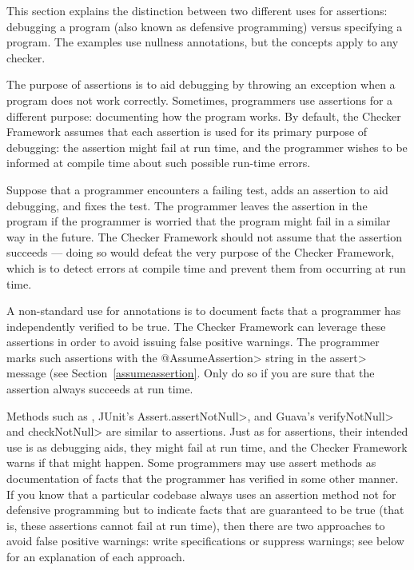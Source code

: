 


This section explains the distinction between two different uses for
assertions:  debugging a program (also known as defensive programming)
versus specifying a program.  The examples use nullness annotations, but
the concepts apply to any checker.

The purpose of assertions is to aid debugging by throwing an exception
when a program does not work correctly.  Sometimes, programmers use assertions for a
different  purpose:  documenting how
the program works.  By default, the Checker Framework assumes that each assertion
is used for its primary purpose of debugging:  the assertion might fail at run time, and the programmer
wishes to be informed at compile time about such possible run-time errors.

Suppose that a
programmer encounters a failing test, adds an assertion to aid debugging, and fixes the
test.  The programmer leaves the assertion in the program if the programmer
is worried that the program might fail in a similar way in the future.
The Checker Framework should not assume that the assertion succeeds ---
doing so would defeat the very purpose of the Checker Framework, which is
to detect errors at compile time and prevent them from occurring at run
time.

A non-standard use for annotations is to document facts that a programmer
has independently verified to be true.  The Checker Framework can
leverage these assertions in order to avoid issuing false positive
warnings.  The programmer marks such assertions with the \<@AssumeAssertion>
string in the \<assert> message (see Section~\ref{assumeassertion}.  Only
do so if you are sure that the assertion always succeeds at run time.

\label{assertion-methods}
Methods such as
,
JUnit's \<Assert.assertNotNull>, and
Guava's \<verifyNotNull> and \<checkNotNull> are
similar to assertions.  Just as for assertions, their intended use is as
debugging aids, they might fail at run time, and the Checker Framework
warns if that might happen.
Some programmers may use assert methods as documentation of facts
that the programmer has verified in some other manner.
If you know that a particular codebase always uses
an assertion method not for defensive programming but to indicate
facts that are guaranteed to be true (that is, these assertions cannot
fail at run time), then there are two approaches to avoid false positive
warnings:  write specifications or suppress
warnings; see below for an explanation of each approach.

